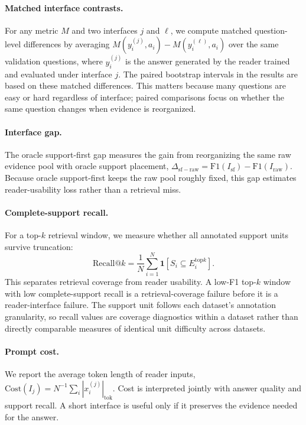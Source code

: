 \documentclass[a4paper,fleqn]{cas-sc}
\begin{document}
\paragraph{Matched interface contrasts.}
For any metric $M$ and two interfaces $j$ and $\ell$, we compute matched
question-level differences by averaging
$M(y_i^{(j)},a_i)-M(y_i^{(\ell)},a_i)$ over the same validation questions,
where $y_i^{(j)}$ is the answer generated by the reader trained and evaluated
under interface $j$. The paired bootstrap intervals in the results are based
on these matched differences. This matters because many questions are easy or
hard regardless of interface; paired comparisons focus on whether the same
question changes when evidence is reorganized.

\paragraph{Interface gap.}
The oracle support-first gap measures the gain from reorganizing the same raw
evidence pool with oracle support placement,
$\Delta_{\mathrm{sf-raw}}=\mathrm{F1}(I_{\mathrm{sf}})-\mathrm{F1}(I_{\mathrm{raw}})$.
Because oracle support-first keeps the raw pool roughly fixed, this gap
estimates reader-usability loss rather than a retrieval miss.

\paragraph{Complete-support recall.}
For a top-$k$ retrieval window, we measure whether all annotated support units
survive truncation:
\begin{equation}
\mathrm{Recall@}k
= \frac{1}{N}\sum_{i=1}^{N}
\mathbf{1}\!\left[S_i \subseteq E_i^{\mathrm{top}k}\right].
\label{eq:support-recall}
\end{equation}
This separates retrieval coverage from reader usability. A low-F1 top-$k$
window with low complete-support recall is a retrieval-coverage failure before
it is a reader-interface failure. The support unit follows each dataset's
annotation granularity, so recall values are coverage diagnostics within a
dataset rather than directly comparable measures of identical unit difficulty
across datasets.

\paragraph{Prompt cost.}
We report the average token length of reader inputs,
$\mathrm{Cost}(I_j)=N^{-1}\sum_i |x_i^{(j)}|_{\mathrm{tok}}$. Cost is
interpreted jointly with answer quality and support recall. A short interface
is useful only if it preserves the evidence needed for the answer.
\end{document}
